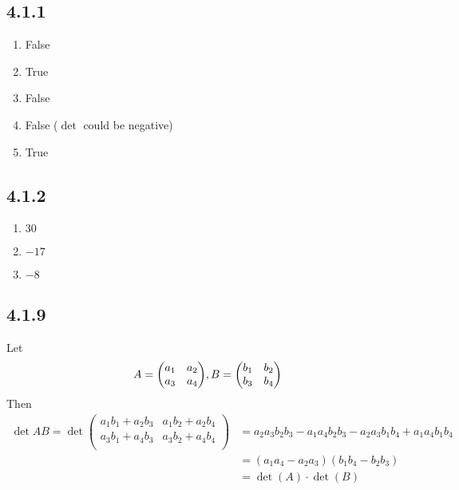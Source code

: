 \documentclass[12pt,titlepage]{extarticle}
\begin{document}
\subsection*{4.1.1}
\begin{enumerate}[label=\alph*)]
    \item False
    \item True
    \item False
    \item False ($\det$ could be negative)
    \item True
\end{enumerate}

\subsection*{4.1.2}
\begin{enumerate}[label=\alph*)]
    \item $30$
    \item $-17$
    \item $-8$
\end{enumerate}

\subsection*{4.1.9}
Let
\[
    A = \mqty(a_1 & a_2 \\ a_3 & a_4), B = \mqty(b_1 & b_2 \\ b_3 & b_4)
\]
Then
\begin{align*}
    \det AB = \det
        \begin{pmatrix}
         a_1 b_1+a_2 b_3 & a_1 b_2+a_2 b_4 \\
         a_3 b_1+a_4 b_3 & a_3 b_2+a_4 b_4 \\
     \end{pmatrix} &= a_2 a_3 b_2 b_3-a_1 a_4 b_2 b_3-a_2 a_3 b_1 b_4+a_1 a_4 b_1 b_4 \\
     &= (a_1 a_4 - a_2 a_3) (b_1 b_4 - b_2 b_3) \\
     &= \det (A) \cdot \det (B)
\end{align*}
\end{document}
